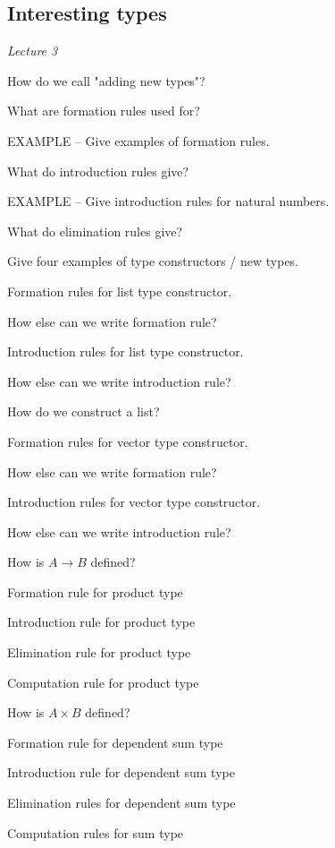 \documentclass[fleqn]{article}
\begin{document}
\subsection{Interesting types}
\textit{Lecture 3}
\begin{enumerate}
    \item How do we call "adding new types"?
    {\color{blue}\item What are formation rules used for?}
    {\color{red}\item EXAMPLE -- Give examples of formation rules.}
    {\color{blue}\item What do introduction rules give?}
    {\color{red}\item EXAMPLE -- Give introduction rules for natural numbers. }
    {\color{blue}\item What do elimination rules give?}
    {\color{red}\item Give four examples of type constructors / new types.}
    {\color{red}\item Formation rules for list type constructor.}
    {\color{red}\item How else can we write formation rule?}
    {\color{red}\item Introduction rules for list type constructor.}
    {\color{red}\item How else can we write introduction rule?}
    \item How do we construct a list?
    {\color{red}\item Formation rules for vector type constructor.}
    {\color{blue}\item How else can we write formation rule?}
    {\color{red}\item Introduction rules for vector type constructor.}
    {\color{red}\item How else can we write introduction rule?}
    {\color{red}\item How is $A \rightarrow B$ defined?}
    {\color{red}\item Formation rule for product type}
    {\color{blue}\item Introduction rule for product type}
    {\color{blue}\item Elimination rule for product type}
    {\color{blue}\item Computation rule for product type}
    {\color{red}\item How is $A \times B$ defined?}
    {\color{red}\item Formation rule for dependent sum type}
    {\color{blue}\item Introduction rule for dependent sum type}
    {\color{blue}\item Elimination rules for dependent sum type}
    {\color{blue}\item Computation rules for sum type}
\end{enumerate}
\end{document}
